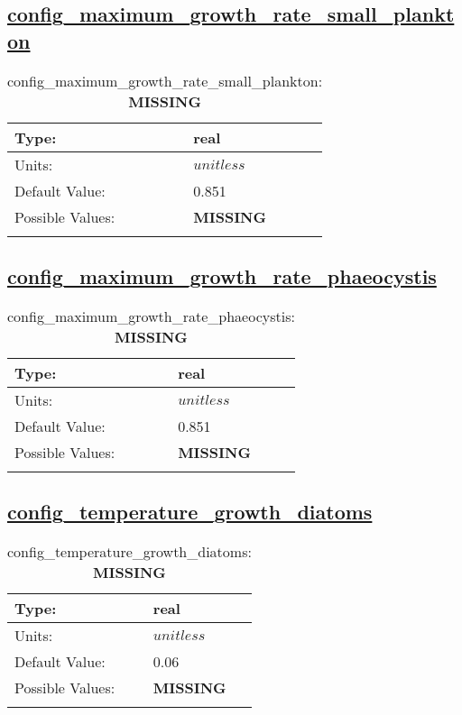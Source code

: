 \subsection[config\_maximum\_growth\_rate\_small\_plankton]{\hyperref[sec:nm_tab_biogeochemistry]{config\_maximum\_growth\_rate\_small\_plankton}}
\label{subsec:nm_sec_config_maximum_growth_rate_small_plankton}
\begin{center}
\begin{longtable}{| p{2.0in} || p{4.0in} |}
    \hline
    Type: & real \\
    \hline
    Units: & $unitless$ \\
    \hline
    Default Value: & 0.851 \\
    \hline
    Possible Values: & {\bf \color{red} MISSING} \\
    \hline
    \caption{config\_maximum\_growth\_rate\_small\_plankton: {\bf \color{red} MISSING}}
\end{longtable}
\end{center}
\subsection[config\_maximum\_growth\_rate\_phaeocystis]{\hyperref[sec:nm_tab_biogeochemistry]{config\_maximum\_growth\_rate\_phaeocystis}}
\label{subsec:nm_sec_config_maximum_growth_rate_phaeocystis}
\begin{center}
\begin{longtable}{| p{2.0in} || p{4.0in} |}
    \hline
    Type: & real \\
    \hline
    Units: & $unitless$ \\
    \hline
    Default Value: & 0.851 \\
    \hline
    Possible Values: & {\bf \color{red} MISSING} \\
    \hline
    \caption{config\_maximum\_growth\_rate\_phaeocystis: {\bf \color{red} MISSING}}
\end{longtable}
\end{center}
\subsection[config\_temperature\_growth\_diatoms]{\hyperref[sec:nm_tab_biogeochemistry]{config\_temperature\_growth\_diatoms}}
\label{subsec:nm_sec_config_temperature_growth_diatoms}
\begin{center}
\begin{longtable}{| p{2.0in} || p{4.0in} |}
    \hline
    Type: & real \\
    \hline
    Units: & $unitless$ \\
    \hline
    Default Value: & 0.06 \\
    \hline
    Possible Values: & {\bf \color{red} MISSING} \\
    \hline
    \caption{config\_temperature\_growth\_diatoms: {\bf \color{red} MISSING}}
\end{longtable}
\end{center}
